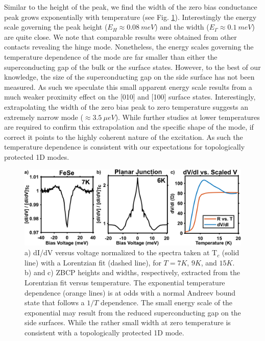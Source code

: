 Similar to the height of the peak, we find the width of the zero bias conductance peak grows exponentially with temperature (see Fig. \ref{DataAnalysis}). Interestingly the energy scale governing the peak height ($E_{H}\approx 0.08~meV$) and the width ($E_{\Gamma}\approx 0.1~meV$) are quite close. We note that comparable results were obtained from other contacts revealing the hinge mode. Nonetheless, the energy scales governing the temperature dependence of the mode are far smaller than either the superconducting gap of the bulk or the surface states.\cite{Zhang2018} However, to the best of our knowledge, the size of the superconducting gap on the side surface has not been measured. As such we speculate this small apparent energy scale results from a much weaker proximity effect on the [010] and [100] surface states. Interestingly, extrapolating the width of the zero bias peak to zero temperature suggests an extremely narrow mode ($\approx 3.5~\mu eV$). While further studies at lower temperatures are required to confirm this extrapolation and the specific shape of the mode, if correct it points to the highly coherent nature of the excitation. As such the temperature dependence is consistent with our expectations for topologically protected 1D modes. 
\par
\begin{figure}
    \centering
    \includegraphics[width=\textwidth]{Chap3/Figures/Figure3.png}
    \caption{a) dI/dV versus voltage normalized to the spectra taken at T$_{c}$ (solid line) with a Lorentzian fit (dashed line), for $T=7K$, $9K$, and $15K$. b) and c) ZBCP heights and widths, respectively, extracted from the Lorentzian fit versus temperature. The exponential temperature dependence (orange lines) is at odds with a normal Andreev bound state that follows a $1/T$ dependence. The small energy scale of the exponential may result from the reduced superconducting gap on the side surfaces. While the rather small width at zero temperature is consistent with a topologically protected 1D mode.}
    \label{DataAnalysis}
\end{figure}
